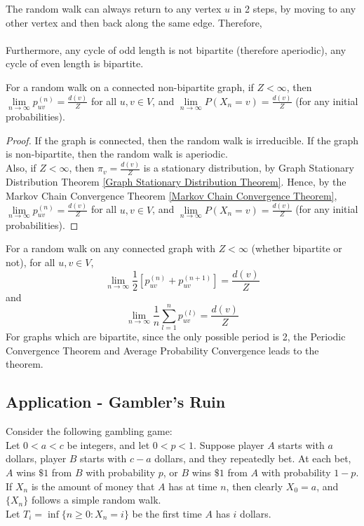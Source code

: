 \documentclass[11pt]{article}
\newcommand{\dur}[3]{{#1}_{#2}^{({#3})}}
\renewcommand{\limit}[1]{\underset{{#1} \rightarrow \infty}{\lim}}
\begin{document}
    \fact[periodicity]
    The random walk can always return to any vertex $u$ in 2 steps, by moving to any other vertex and then back along the same edge. Therefore,  \\
    \\
    Furthermore, any cycle of odd length is not bipartite (therefore aperiodic), any cycle of even length is bipartite.
    
     For a random walk on a connected non-bipartite graph, if $Z < \infty$, then $\limit{n} \dur{p}{uv}{n} = \frac{d(v)}{Z}$ for all $u, v \in V$, and $\limit{n} P(X_n = v) = \frac{d(v)}{Z}$ (for any initial probabilities).
    \begin{proof}
    	If the graph is connected, then the random walk is irreducible. If the graph is non-bipartite, then the random walk is aperiodic. \\
    	Also, if $Z < \infty$, then $\pi_v = \frac{d(v)}{Z}$ is a stationary distribution, by Graph Stationary Distribution Theorem \ref{Graph Stationary Distribution Theorem}. 
    	Hence, by the Markov Chain Convergence Theorem \ref{Markov Chain Convergence Theorem}, $\limit{n} \dur{p}{uv}{n} = \frac{d(v)}{Z}$ for all $u, v \in V$, and $\limit{n} P(X_n = v) = \frac{d(v)}{Z}$ (for any initial probabilities). 
    \end{proof}
    
     For a random walk on any connected graph with $Z < \infty$ (whether bipartite or not), for all $u, v \in V$, 
    $$\limit{n} \frac{1}{2}[\dur{p}{uv}{n} + \dur{p}{uv}{n+1}] = \frac{d(v)}{Z}$$
    and
    $$\limit{n} \frac{1}{n}\sum_{l=1}^n \dur{p}{uv}{l} = \frac{d(v)}{Z}$$
   	\remark
   	For graphs which are bipartite, since the only possible period is 2, the Periodic Convergence Theorem and Average Probability Convergence leads to the theorem.
   	
    \subsection{Application - Gambler's Ruin}
    Consider the following gambling game: \\
    Let $0 < a < c$ be integers, and let $0 < p < 1$. Suppose player $A$ starts with $a$ dollars, player $B$ starts with $c - a$ dollars, and they repeatedly bet. At each bet, $A$ wins $\$1$ from $B$ with probability $p$, or $B$ wins $\$ 1$ from $A$ with probability $1 - p$.\\
    If $X_n$ is the amount of money that $A$ has at time $n$, then clearly $X_0 = a$, and $\{X_n\}$ follows a simple random walk.\\
    Let $T_i = \inf\{n \geq 0: X_n = i\}$ be the first time $A$ has $i$ dollars.
\end{document}
